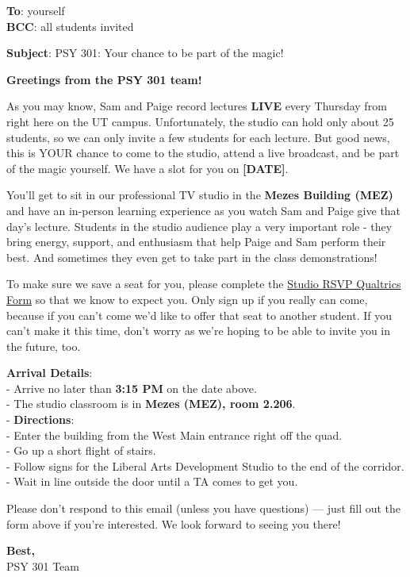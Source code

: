 \documentclass[
]{article}
\begin{document}
\textbf{To}: yourself\\
\textbf{BCC}: all students invited

\textbf{Subject}: PSY 301: Your chance to be part of the magic!

\textbf{Greetings from the PSY 301 team!}

As you may know, Sam and Paige record lectures \textbf{LIVE} every Thursday from right here on the UT campus. Unfortunately, the studio can hold only about 25 students, so we can only invite a few students for each lecture. But good news, this is YOUR chance to come to the studio, attend a live broadcast, and be part of the magic yourself. We have a slot for you on \textbf{{[}DATE{]}}.

You'll get to sit in our professional TV studio in the \textbf{Mezes Building (MEZ)} and have an in-person learning experience as you watch Sam and Paige give that day's lecture. Students in the studio audience play a very important role - they bring energy, support, and enthusiasm that help Paige and Sam perform their best. And sometimes they even get to take part in the class demonstrations!

To make sure we save a seat for you, please complete the \href{\%60r\%20params$studio_recruitment_qualtrics_form\%60}{Studio RSVP Qualtrics Form} so that we know to expect you. Only sign up if you really can come, because if you can't come we'd like to offer that seat to another student. If you can't make it this time, don't worry as we're hoping to be able to invite you in the future, too.

\textbf{Arrival Details}:\\
- Arrive no later than \textbf{3:15 PM} on the date above.\\
- The studio classroom is in \textbf{Mezes (MEZ), room 2.206}.\\
- \textbf{Directions}:\\
- Enter the building from the West Main entrance right off the quad.\\
- Go up a short flight of stairs.\\
- Follow signs for the Liberal Arts Development Studio to the end of the corridor.\\
- Wait in line outside the door until a TA comes to get you.

Please don't respond to this email (unless you have questions) --- just fill out the form above if you're interested. We look forward to seeing you there!

\textbf{Best,}\\
PSY 301 Team
\end{document}
